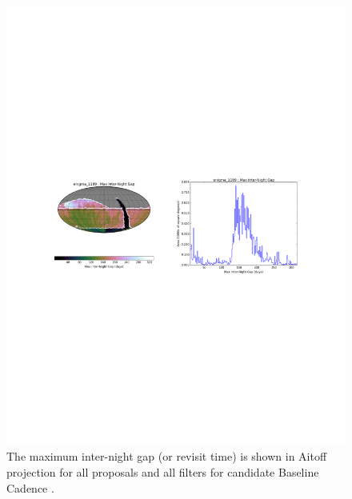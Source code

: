 \begin{figure}[b!]
\vskip -3.8in
\hskip -0.5in
\includegraphics[angle=0,width=1.19\hsize:,clip]{figs/enigma1189_MAXinterGapAll.pdf}
\vskip -4.0in
\caption{The maximum inter-night gap (or revisit time) is shown in Aitoff projection
for all proposals and all filters for candidate Baseline Cadence .}
\label{fig:enigmaMAXGapAll}
\end{figure}

